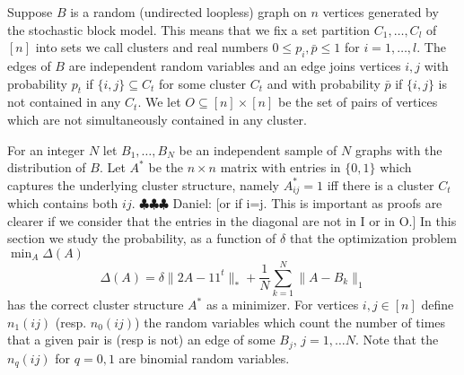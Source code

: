 \documentclass[12pt]{amsart}
\theoremstyle{remark}
\newcommand{\ddr}[1]{{\color{blue} \sf $\clubsuit\clubsuit\clubsuit$ Daniel: [#1]}}
\begin{document}
Suppose $B$ is a random (undirected loopless) graph on $n$ vertices generated by the stochastic block model. This means that we fix a set partition $C_1,\dots, C_l$ of $[n]$ into sets we call clusters and real numbers $0\leq p_i,\bar{p}\leq 1$ for $i=1,\dots, l$. The edges of $B$ are independent random variables and an edge joins vertices $i,j$ with probability $p_t$ if $\{i,j\}\subseteq C_t$ for some cluster $C_t$ and with probability $\bar{p}$ if $\{i,j\}$ is not contained in any $C_t$. We let $O\subseteq [n]\times [n]$ be the set of pairs of vertices which are not simultaneously contained in any cluster. 

For an integer $N$ let $B_1,\dots, B_N$ be an independent sample of $N$ graphs with the distribution of $B$. Let $A^*$ be the $n\times n$ matrix with entries in $\{0,1\}$ which captures the underlying cluster structure, namely $A^*_{ij}=1$ iff there is a cluster $C_t$ which contains both $ij$.
\ddr{or if i=j. This is important as proofs are clearer if we consider that the entries in the diagonal are not in I or in O.}
In this section we study the probability, as a function of $\delta$ that the optimization problem $\min_A\Delta(A)$
\[\Delta(A)= \delta\|2A-11^t\|_{*}+\frac{1}{N}\sum_{k=1}^N\|A-B_k\|_1\] 
has the correct cluster structure $A^*$ as a minimizer. For vertices $i,j\in [n]$ define $n_1(ij)$ (resp. $n_0(ij)$) the random variables which count the number of times that a given pair is (resp is not) an edge of some $B_j$, $j=1,\dots N$. Note that the $n_q(ij)$ for $q=0,1$ are binomial random variables.  
\end{document}
